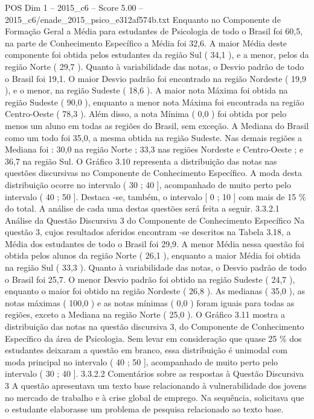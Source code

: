 \begin{textsample}{POS Dim 1 – 2015\_c6 – Score 5.00 – 2015\_c6/enade\_2015\_psico\_e312af574b.txt}
Enquanto no Componente de Formação Geral a Média para estudantes de Psicologia de todo o Brasil foi 60,5, na parte de Conhecimento Específico a Média foi 32,6.
A maior Média deste componente foi obtida pelos estudantes da região Sul ( 34,1 ), e a menor, pelos da região Norte ( 29,7 ).
Quanto à variabilidade das notas, o Desvio padrão de todo o Brasil foi 19,1.
O maior Desvio padrão foi encontrado na região Nordeste ( 19,9 ), e o menor, na região Sudeste ( 18,6 ).
A maior nota Máxima foi obtida na região Sudeste ( 90,0 ), enquanto a menor nota Máxima foi encontrada na região Centro-Oeste ( 78,3 ).
Além disso, a nota Mínima ( 0,0 ) foi obtida por pelo menos um aluno em todas as regiões do Brasil, sem exceção.
A Mediana do Brasil como um todo foi 35,0, a mesma obtida na região Sudeste.
Nas demais regiões a Mediana foi : 30,0 na região Norte ; 33,3 nas regiões Nordeste e Centro-Oeste ; e 36,7 na região Sul.
O Gráfico 3.10 representa a distribuição das notas nas questões discursivas no Componente de Conhecimento Específico.
A moda desta distribuição ocorre no intervalo ( 30 ; 40 ], acompanhado de muito perto pelo intervalo ( 40 ; 50 ].
Destaca -se, também, o intervalo [ 0 ; 10 ] com mais de 15 \% do total.
A análise de cada uma destas questões será feita a seguir. 3.3.2.1 Análise da Questão Discursiva 3 do Componente de Conhecimento Específico Na questão 3, cujos resultados aferidos encontram -se descritos na Tabela 3.18, a Média dos estudantes de todo o Brasil foi 29,9.
A menor Média nessa questão foi obtida pelos alunos da região Norte ( 26,1 ), enquanto a maior Média foi obtida na região Sul ( 33,3 ).
Quanto à variabilidade das notas, o Desvio padrão de todo o Brasil foi 25,7.
O menor Desvio padrão foi obtido na região Sudeste ( 24,7 ), enquanto o maior foi obtido na região Nordeste ( 26,8 ).
As medianas ( 35,0 ), as notas máximas ( 100,0 ) e as notas mínimas ( 0,0 ) foram iguais para todas as regiões, exceto a Mediana na região Norte ( 25,0 ).
O Gráfico 3.11 mostra a distribuição das notas na questão discursiva 3, do Componente de Conhecimento Específico da área de Psicologia.
Sem levar em consideração que quase 25 \% dos estudantes deixaram a questão em branco, essa distribuição é unimodal com moda principal no intervalo ( 40 ; 50 ], acompanhado de muito perto pelo intervalo ( 30 ; 40 ]. 3.3.2.2 Comentários sobre as respostas à Questão Discursiva 3 A questão apresentava um texto base relacionando à vulnerabilidade dos jovens no mercado de trabalho e à crise global de emprego.
Na sequência, solicitava que o estudante elaborasse um problema de pesquisa relacionado ao texto base.

\end{textsample}
